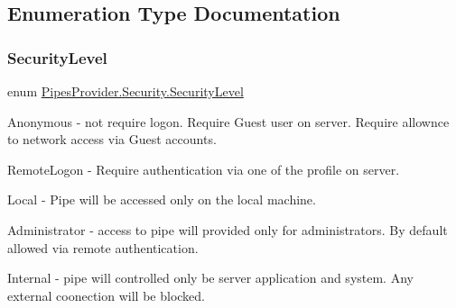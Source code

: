 \subsection{Enumeration Type Documentation}
\mbox{\label{namespace_pipes_provider_1_1_security_a1a6020eca1c661a6f7140e8260502d7e}} 
\subsubsection{\texorpdfstring{Security\+Level}{SecurityLevel}}
{\footnotesize\ttfamily enum \mbox{\hyperlink{namespace_pipes_provider_1_1_security_a1a6020eca1c661a6f7140e8260502d7e}{Pipes\+Provider.\+Security.\+Security\+Level}}\hspace{0.3cm}{\ttfamily [strong]}}



Anonymous -\/ not require logon. Require Guest user on server. Require allownce to network access via Guest accounts. 

Remote\+Logon -\/ Require authentication via one of the profile on server.

Local -\/ Pipe will be accessed only on the local machine.

Administrator -\/ access to pipe will provided only for administrators. By default allowed via remote authentication.

Internal -\/ pipe will controlled only be server application and system. Any external coonection will be blocked. 